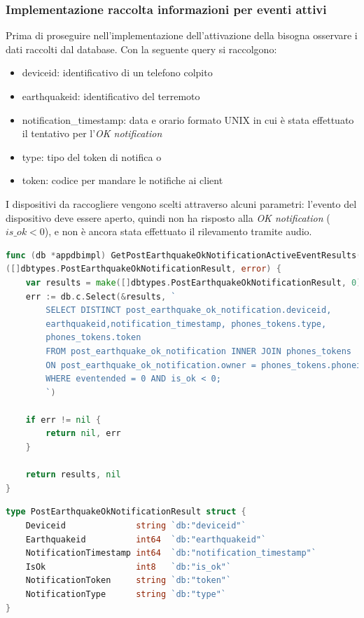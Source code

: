 \documentclass[main.tex]{subfiles}
\begin{document}
\subsubsection{Implementazione raccolta informazioni per eventi attivi}
Prima di proseguire nell'implementazione dell'attivazione della  bisogna osservare i dati raccolti dal database. Con la seguente query si raccolgono:
\begin{itemize}
    \item deviceid: identificativo di un telefono colpito
    \item earthquakeid: identificativo del terremoto
    \item notification\_timestamp: data e orario formato UNIX in cui è stata effettuato il tentativo per l'\emph{OK notification}
    \item type: tipo del token di notifica  o  
    \item token: codice per mandare le notifiche ai client
\end{itemize}
I dispositivi da raccogliere vengono scelti attraverso alcuni parametri: l'evento del dispositivo deve essere aperto, quindi non ha risposto alla \emph{OK notification} (\(is\_ok < 0\)), e non è ancora stata effettuato il rilevamento tramite audio.  
\begin{lstlisting}[language=go]
func (db *appdbimpl) GetPostEarthquakeOkNotificationActiveEventResults() 
([]dbtypes.PostEarthquakeOkNotificationResult, error) {
    var results = make([]dbtypes.PostEarthquakeOkNotificationResult, 0)
    err := db.c.Select(&results, `
        SELECT DISTINCT post_earthquake_ok_notification.deviceid,
        earthquakeid,notification_timestamp, phones_tokens.type, 
        phones_tokens.token
        FROM post_earthquake_ok_notification INNER JOIN phones_tokens
        ON post_earthquake_ok_notification.owner = phones_tokens.phoneid
        WHERE eventended = 0 AND is_ok < 0;
        `)
    
    if err != nil {
        return nil, err
    }
    
    return results, nil
}
\end{lstlisting}
\begin{lstlisting}[language=go]
type PostEarthquakeOkNotificationResult struct {
	Deviceid              string `db:"deviceid"`
	Earthquakeid          int64  `db:"earthquakeid"`
	NotificationTimestamp int64  `db:"notification_timestamp"`
	IsOk                  int8   `db:"is_ok"`
	NotificationToken     string `db:"token"`
	NotificationType      string `db:"type"`
}
\end{lstlisting}
\end{document}
